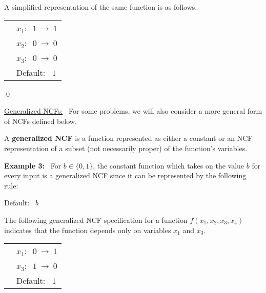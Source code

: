 \medskip
\noindent
A simplified representation of the same function is as follows.

\bigskip

\noindent
\begin{tabular}{ll}
\hspace*{1.1in} & $x_1:~$  $1 ~\longrightarrow~ 1$ \\ [1ex]
\hspace*{1.1in} & $x_2:~$  $0 ~\longrightarrow~ 0$ \\ [1ex]
\hspace*{1.1in} & $x_3:~$  $0 ~\longrightarrow~ 0$ \\ [1ex]
\hspace*{1.1in} & Default:~ $1$ \\
\end{tabular}

\noindent
\qed



\iffalse
\noindent
\underline{\textsf{Generalized NCFs:}}~
For some problems, we will also consider a more general form
of NCFs defined below.

\begin{definition}\label{def:generalized ncf}
A {\bf generalized NCF} is a function represented as either a constant
or an NCF representation of a subset (not necessarily proper) 
of the function's variables.
\end{definition}

\noindent
\textbf{Example 3:}~ For $b \in \{0,1\}$, the constant function which takes 
on the value $b$ for every input is a generalized NCF since 
it can be represented by the following rule: 

\smallskip

\hspace*{1.1in} Default:~ $b$ 

\smallskip

\noindent
The following generalized NCF specification for 
a function $f(x_1, x_2, x_3, x_4)$ indicates that the function
depends only on variables $x_1$ and $x_3$.

\medskip

\noindent
\begin{tabular}{ll}
\hspace*{1.1in} & $x_1:~$  $0 ~\longrightarrow~ 1$ \\ [1ex]
\hspace*{1.1in} & $x_3:~$  $1 ~\longrightarrow~ 0$ \\ [1ex]
\hspace*{1.1in} & Default:~ $1$ \\
\end{tabular}

